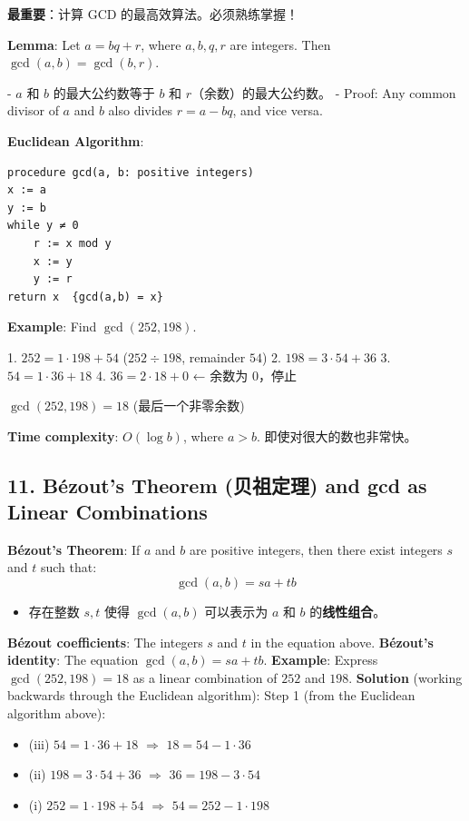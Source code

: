 \documentclass[10pt,a4paper,openany]{ctexbook}
\theoremstyle{definition}
\theoremstyle{remark}
\renewenvironment{quote}
  {\list{}{\leftmargin=1em\rightmargin=0pt\topsep=0.5pt\partopsep=0pt}\item[]}
  {\endlist}
\begin{document}
\begin{quote}
\textbf{最重要}：计算 GCD 的最高效算法。必须熟练掌握！

\textbf{Lemma}: Let $a = bq + r$, where $a, b, q, r$ are integers. Then $\gcd(a, b) = \gcd(b, r)$.

- $a$ 和 $b$ 的最大公约数等于 $b$ 和 $r$（余数）的最大公约数。
- Proof: Any common divisor of $a$ and $b$ also divides $r = a - bq$, and vice versa.

\textbf{Euclidean Algorithm}:
{\footnotesize\begin{verbatim}
procedure gcd(a, b: positive integers)
x := a
y := b
while y ≠ 0
    r := x mod y
    x := y
    y := r
return x  {gcd(a,b) = x}
\end{verbatim}}


\textbf{Example}: Find $\gcd(252, 198)$.

1. $252 = 1 \cdot 198 + 54$  ($252 \div 198$, remainder $54$)
2. $198 = 3 \cdot 54 + 36$
3. $54 = 1 \cdot 36 + 18$
4. $36 = 2 \cdot 18 + 0$  ← 余数为 0，停止

$\gcd(252, 198) = 18$ (最后一个非零余数)

\textbf{Time complexity}: $O(\log b)$, where $a > b$. 即使对很大的数也非常快。

\end{quote}
\vspace{-2pt}

\subsection{11. B\'ezout's Theorem (贝祖定理) and gcd as Linear Combinations}

\textbf{B\'ezout's Theorem}: If $a$ and $b$ are positive integers, then there exist integers $s$ and $t$ such that:
\[
\gcd(a, b) = sa + tb
\]

\begin{itemize}
\item 存在整数 $s, t$ 使得 $\gcd(a,b)$ 可以表示为 $a$ 和 $b$ 的\textbf{线性组合}。

\end{itemize}

\textbf{B\'ezout coefficients}: The integers $s$ and $t$ in the equation above.
\textbf{B\'ezout's identity}: The equation $\gcd(a,b) = sa + tb$.
\textbf{Example}: Express $\gcd(252, 198) = 18$ as a linear combination of $252$ and $198$.
\textbf{Solution} (working backwards through the Euclidean algorithm):
Step 1 (from the Euclidean algorithm above):
\begin{itemize}
\item (iii) $54 = 1 \cdot 36 + 18$  $\Rightarrow$ $18 = 54 - 1 \cdot 36$
\item (ii) $198 = 3 \cdot 54 + 36$ $\Rightarrow$ $36 = 198 - 3 \cdot 54$
\item (i) $252 = 1 \cdot 198 + 54$ $\Rightarrow$ $54 = 252 - 1 \cdot 198$

\end{itemize}
\end{document}
